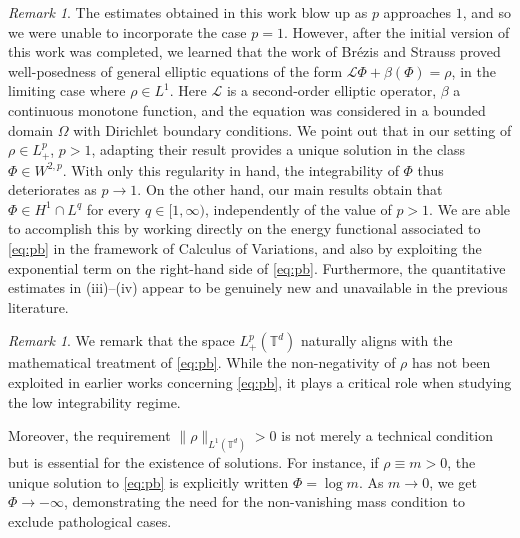 \documentclass[11pt,reqno,a4paper]{amsart}
\theoremstyle{definition}
\theoremstyle{remark}
\newtheorem{remark}[lemma]{Remark}
\numberwithin{equation}{section}
\newcommand{\T} {\mathbb T}
\newcommand{\calL}{\mathcal L}
\begin{document}
\begin{remark}
    The estimates obtained in this work blow up as $p$ approaches $1$, and so we were unable to incorporate the case $p=1$. However, after the initial version of this work was completed, we learned that the work of Br\'ezis and Strauss \cite{BS73} proved well-posedness of general elliptic equations of the form $\calL \Phi + \beta(\Phi) = \rho$, in the limiting case where $\rho\in L^1$. Here $\calL$ is a second-order elliptic operator, $\beta$ a continuous monotone function, and the equation was considered in a bounded domain $\Omega$ with Dirichlet boundary conditions. We point out that in our setting of $\rho\in L^p_+$, $p>1$, adapting their result \cite[Corollary 12]{BS73} provides a unique solution in the class $\Phi\in W^{2,p}$. With only this regularity in hand, the integrability of $\Phi$ thus deteriorates as $p\to 1$. On the other hand, our main results obtain that $\Phi\in H^1\cap L^q$ for every $q\in [1,\infty)$, independently of the value of $p>1$. We are able to accomplish this by working directly on the energy functional associated to \eqref{eq:pb} in the framework of Calculus of Variations, and also by exploiting the exponential term on the right-hand side of \eqref{eq:pb}. Furthermore, the quantitative estimates in (iii)--(iv) appear to be genuinely new and unavailable in the previous literature. 
\end{remark}

\begin{remark}
    We remark that the space $L^p_+(\T^d)$ naturally aligns with the mathematical treatment of  \eqref{eq:pb}. While the non-negativity of $\rho$ has not been exploited in earlier works concerning \eqref{eq:pb}, it plays a critical role when studying the low integrability regime.
    
    Moreover, the requirement $\|\rho\|_{L^1(\T^d)}>0$ is not merely a technical condition but is essential for the existence of solutions. For instance, if $\rho\equiv m > 0$, the unique solution to \eqref{eq:pb} is explicitly written $\Phi = \log m$. As $m \to 0$, we get $\Phi \to -\infty$, demonstrating the need for the non-vanishing mass condition to exclude pathological cases.
\end{remark}
\end{document}
